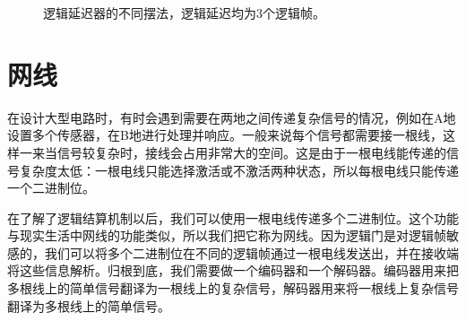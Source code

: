 \begin{figure}[!ht]
\begin{center}
\qquad
{}
\qquad
{}
\qquad
{}
\end{center}
\caption{逻辑延迟器的不同摆法，逻辑延迟均为3个逻辑帧。}
\label{i153:156}
\end{figure}

\section{网线}\label{sec17}
在设计大型电路时，有时会遇到需要在两地之间传递复杂信号的情况，例如在A地设置多个传感器，在B地进行处理并响应。一般来说每个信号都需要接一根线，这样一来当信号较复杂时，接线会占用非常大的空间。这是由于一根电线能传递的信号复杂度太低：一根电线只能选择激活或不激活两种状态，所以每根电线只能传递一个二进制位。

在了解了逻辑结算机制以后，我们可以使用一根电线传递多个二进制位。这个功能与现实生活中网线的功能类似，所以我们把它称为网线。因为逻辑门是对逻辑帧敏感的，我们可以将多个二进制位在不同的逻辑帧通过一根电线发送出，并在接收端将这些信息解析。归根到底，我们需要做一个编码器和一个解码器。编码器用来把多根线上的简单信号翻译为一根线上的复杂信号，解码器用来将一根线上复杂信号翻译为多根线上的简单信号。

